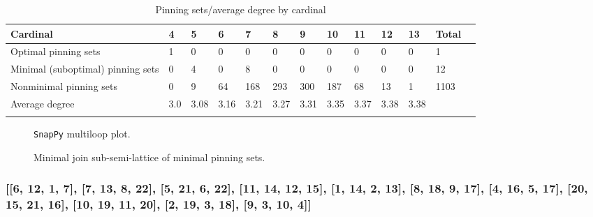 \documentclass{article}%
\begin{document}
\begin{table}[ht]
	\caption{Pinning sets/average degree by cardinal}
	\centering
	\renewcommand{\arraystretch}{1.5}
	\begin{tabularx}{\textwidth}{lXXXXXXXXXXXX}
		\toprule
			Cardinal & 4 & 5 & 6 & 7 & 8 & 9 & 10 & 11 & 12 & 13 & Total\\
			\hline
			Optimal pinning sets & 1 & 0 & 0 & 0 & 0 & 0 & 0 & 0 & 0 & 0 & 1 \\
			Minimal (suboptimal) pinning sets & 0 & 4 & 0 & 8 & 0 & 0 & 0 & 0 & 0 & 0 & 12 \\
			Nonminimal pinning sets & 0 & 9 & 64 & 168 & 293 & 300 & 187 & 68 & 13 & 1 & 1103 \\
			Average degree & 3.0 & 3.08 & 3.16 & 3.21 & 3.27 & 3.31 & 3.35 & 3.37 & 3.38 & 3.38 &  \\
		\bottomrule \\ 
	\end{tabularx}
\end{table}

\begin{multicols}{2}
\begin{figure}[H]
\centering

\caption{\texttt{SnapPy} multiloop plot.}
\label{fig:tex/img/[[14, 18, 1, 15], [15, 9, 16, 10], [6, 13, 7, 14], [7, 17, 8, 18], [1, 8, 2, 9], [16, 2, 17, 3], [10, 19, 11, 22], [5, 21, 6, 22], [12, 20, 13, 21], [3, 20, 4, 19], [11, 4, 12, 5]].svg}
\end{figure}
\columnbreak

\begin{figure}[H]
\centering
\scalebox{0.8}{}
\caption{Minimal join sub-semi-lattice of minimal pinning sets.}
\label{fig:tex/img/[[14, 18, 1, 15], [15, 9, 16, 10], [6, 13, 7, 14], [7, 17, 8, 18], [1, 8, 2, 9], [16, 2, 17, 3], [10, 19, 11, 22], [5, 21, 6, 22], [12, 20, 13, 21], [3, 20, 4, 19], [11, 4, 12, 5]].pgf}
\end{figure}
\end{multicols}

\newpage

\subsubsection{[[6, 12, 1, 7], [7, 13, 8, 22], [5, 21, 6, 22], [11, 14, 12, 15], [1, 14, 2, 13], [8, 18, 9, 17], [4, 16, 5, 17], [20, 15, 21, 16], [10, 19, 11, 20], [2, 19, 3, 18], [9, 3, 10, 4]]}
\end{document}
